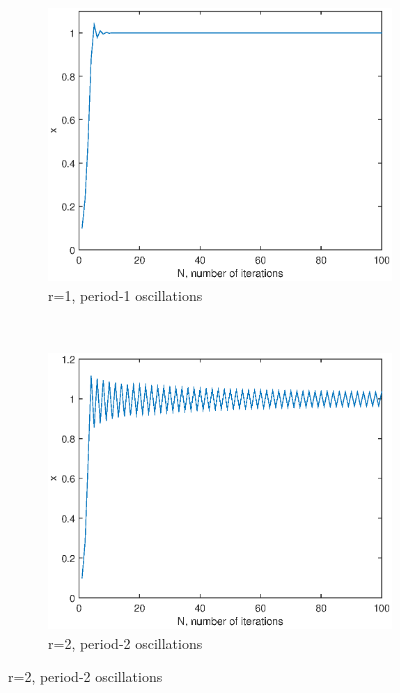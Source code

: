 \documentclass[a4paper]{article}
\begin{document}
\begin{figure}
    \centering
    \begin{subfigure}[b]{0.3\textwidth}
        \includegraphics[width=\textwidth]{verhulstPeriod1}
        \caption{r=1, period-1 oscillations}
    \end{subfigure}%
    ~ %
    \begin{subfigure}[b]{0.3\textwidth}
        \includegraphics[width=\textwidth]{verhulstPeriod2}
        \caption{r=2, period-2 oscillations}

\end{subfigure}
\end{figure}
\end{document}
